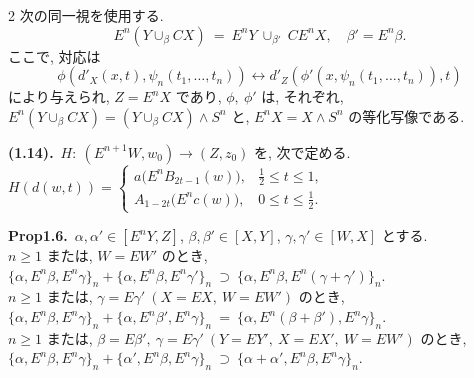 \documentclass[10pt, leqno]{ltjsarticle}
\newcommand{\Ex}{E}        %
\numberwithin{equation}{section}
\theoremstyle{plain}
\theoremstyle{definition}
\theoremstyle{remark}
\begin{document}
\begin{paracol}{2}
次の同一視を使用する.
\begin{equation}\label{eq:cone-susp}
\Ex^n(Y\cup_\beta CX)\ =\ 
\Ex^nY\ \cup_{\beta'}\ C\Ex^n X,\quad \beta'=\Ex^n \beta.
\end{equation}
ここで, 対応は
\[
\phi(d'_X(x,t),\psi_n(t_1,\ldots,t_n))\longleftrightarrow d'_Z(\phi'(x,\psi_n(t_1,\ldots,t_n)),t)
\]
により与えられ, $Z=\Ex^n X$ であり, 
$\phi, \ \phi'$ は, それぞれ, \\
$\Ex^n(Y\cup_\beta CX)=(Y\cup_\beta CX)\wedge S^n$ と,
$\Ex^n X=X\wedge S^n$ の等化写像である. 

\switchcolumn

\noindent
\textbf{(1.14).}\ $H:\ (\Ex^{n+1}W,w_0)\to (Z,z_0)$ を, 次で定める. \\
\(
H(d(w,t))=
\begin{cases}
a\bigl(\Ex^n B_{2t-1}(w)\bigr), & \tfrac12\le t\le 1,\\[2mm]
A_{1-2t}\bigl(\Ex^n c(w)\bigr), & 0\le t\le \tfrac12.
\end{cases}
\)

\noindent
\textbf{Prop1.6.}\
$\alpha,\alpha'\in[\Ex^n Y, Z]$, $\beta,\beta'\in[X, Y]$, 
$\gamma,\gamma'\in[W, X]$ とする. \\
$n\ge 1$ または, $W=\Ex W'$ のとき,\\
\(
\{\alpha,\Ex^n\beta,\Ex^n\gamma\}_n
+
\{\alpha,\Ex^n\beta,\Ex^n\gamma'\}_n
\ \supset\
\{\alpha,\Ex^n\beta,\Ex^n(\gamma+\gamma')\}_n.
\)\\
$n\ge 1$ または, $\gamma=\Ex\gamma' \ (X=\Ex X,\ W=\Ex W')$ のとき,\\
\(
\{\alpha,\Ex^n\beta,\Ex^n\gamma\}_n
+
\{\alpha,\Ex^n\beta',\Ex^n\gamma\}_n
\ =\
\{\alpha,\Ex^n(\beta+\beta'),\Ex^n\gamma\}_n.
\)\\
$n\ge 1$ または,
$\beta=\Ex\beta',\ \gamma=\Ex\gamma' \ (Y=\Ex Y',\ X=\Ex X',\ W=\Ex W')$ のとき,\\
\(
\{\alpha,\Ex^n\beta,\Ex^n\gamma\}_n
+
\{\alpha',\Ex^n\beta,\Ex^n\gamma\}_n
\ \supset\
\{\alpha+\alpha',\Ex^n\beta,\Ex^n\gamma\}_n.
\)




\end{paracol}
\end{document}
